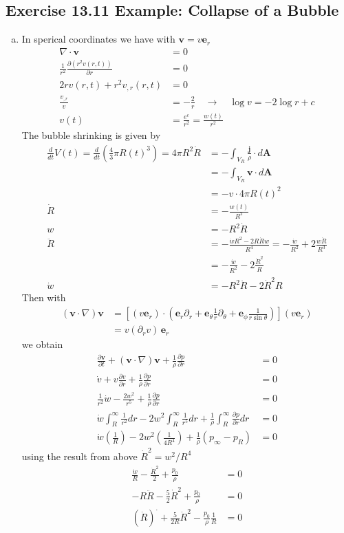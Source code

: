 \documentclass[10pt,a4paper]{book}
\theoremstyle{definition}
\begin{document}
\subsection{Exercise 13.11 Example: Collapse of a Bubble}
\begin{enumerate}[(a)]
\item In sperical coordinates we have with $\mathbf{v}=v\mathbf{e}_r$
\begin{align}
\nabla\cdot\mathbf{v}&=0\\
\frac{1}{r^2}\frac{\partial (r^2 v(r,t))}{\partial r}&=0\\
2rv(r,t)+r^2v_{,r}(r,t)&=0\\
\frac{v_{,r}}{v}&=-\frac{2}{r}\quad\rightarrow\quad \log v=-2\log r+c\\
v(t)&=\frac{e^c}{r^2}=\frac{w(t)}{r^2}
\end{align}
The bubble shrinking is given by
\begin{align}
\frac{d}{dt}V(t)
=\frac{d}{dt}\left(\frac{4}{3}\pi R(t)^3\right)
=4\pi R^2\dot{R}
&=-\int_{V_R} \frac{\mathbf{j}}{\rho}\cdot d\mathbf{A}\\
&=-\int_{V_R} \mathbf{v}\cdot d\mathbf{A}\\
&=-v\cdot 4\pi R(t)^2\\
\dot{R}&=-\frac{w(t)}{R^2}\\
w&=-R^2\dot{R}\\
\ddot{R}&=-\frac{\dot{w}R^2-2R\dot{R}w}{R^4}=-\frac{\dot{w}}{R^2}+2\frac{w\dot{R}}{R^3}\\
&=-\frac{\dot{w}}{R^2}-2\frac{\dot{R}^2}{R}\\
\dot{w}&=-R^2\ddot{R}-2\dot{R}^2R
\end{align}
Then with
\begin{align}
(\mathbf{v}\cdot\nabla)\mathbf{v}
&=\left[(v\mathbf{e}_r)\cdot\left(\mathbf{e}_r\partial_r+\mathbf{e}_\theta\frac{1}{r}\partial_\theta+\mathbf{e}_\phi\frac{1}{r\sin\theta}\right)\right](v\mathbf{e}_r)\\
&=v(\partial_r v)\,\mathbf{e}_r
\end{align}
we obtain
\begin{align}
\frac{\partial\mathbf{v}}{\partial t}+(\mathbf{v}\cdot\nabla)\mathbf{v}+\frac{1}{\rho}\frac{\partial p}{\partial r}&=0\\
\dot{v}+v\frac{\partial v}{\partial r}+\frac{1}{\rho}\frac{\partial p}{\partial r}&=0\\
\frac{1}{r^2}\dot{w}-\frac{2w^2}{r^5}+\frac{1}{\rho}\frac{\partial p}{\partial r}&=0\\
\dot{w}\int_R^\infty\frac{1}{r^2}dr-2w^2\int_R^\infty\frac{1}{r^5}dr+\frac{1}{\rho}\int_R^\infty\frac{\partial p}{\partial r}dr&=0\\
\dot{w}\left(\frac{1}{R}\right)-2w^2\left(\frac{1}{4R^4}\right)+\frac{1}{\rho}(p_\infty-p_R)&=0
\end{align}
using the result from above $\dot{R}^2=w^2/R^4$
\begin{align}
\frac{\dot{w}}{R}-\frac{\dot{R}^2}{2}+\frac{p_0}{\rho}&=0\\
-R\ddot{R}-\frac{5}{2}\dot{R}^2+\frac{p_0}{\rho}&=0\\
(\dot{R})^{\cdot}+\frac{5}{2R}\dot{R}^2-\frac{p_0}{\rho}\frac{1}{R}&=0
\end{align}


\end{enumerate}
\end{document}
